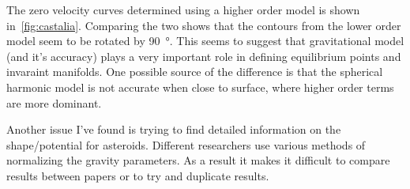 The zero velocity curves determined using a higher order model is shown in~\cref{fig:castalia}.
Comparing the two shows that the contours from the lower order model seem to be rotated by \SI{90}{\degree}.
This seems to suggest that gravitational model (and it's accuracy) plays a very important role in defining equilibrium points and invaraint manifolds.
One possible source of the difference is that the spherical harmonic model is not accurate when close to surface, where higher order terms are more dominant.

Another issue I've found is trying to find detailed information on the shape/potential for asteroids.
Different researchers use various methods of normalizing the gravity parameters. 
As a result it makes it difficult to compare results between papers or to try and duplicate results.

